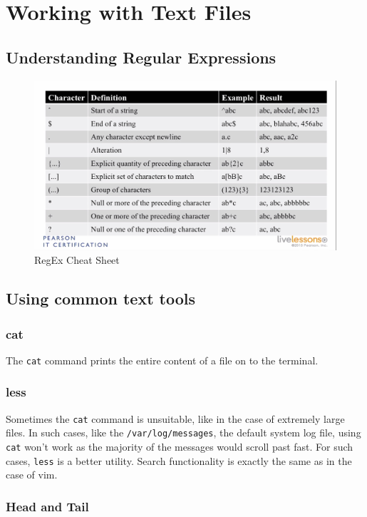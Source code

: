\chapter{Working with Text Files}
\section{Understanding Regular Expressions}
\begin{figure}[h]
	\centering
	\includegraphics[width=0.9\linewidth]{"Mod1/chapters/1.4.a RegEx Cheat Sheet"}
	\caption{RegEx Cheat Sheet}
	\label{fig:regex-cheat-sheet}
\end{figure}


\section{Using common text tools}
\subsection{cat}
The \verb|cat| command prints the entire content of a file on to the terminal. 

\subsection{less}
Sometimes the \verb|cat| command is unsuitable, like in the case of extremely large files. In such cases, like the \verb|/var/log/messages|, the default system log file, using \verb|cat| won't work as the majority of the messages would scroll past fast. For such cases, \verb|less| is a better utility. Search functionality is exactly the same as in the case of vim. 

\subsection{Head and Tail}
